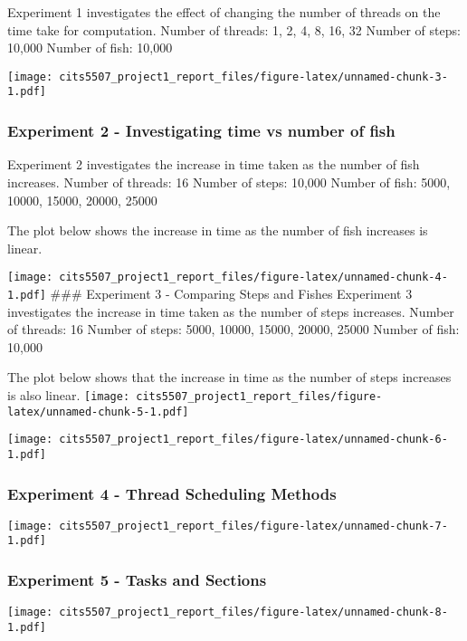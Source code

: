\documentclass[
]{article}
\begin{document}
Experiment 1 investigates the effect of changing the number of threads
on the time take for computation. Number of threads: 1, 2, 4, 8, 16, 32
Number of steps: 10,000 Number of fish: 10,000

\texttt{[image: cits5507\_project1\_report\_files/figure-latex/unnamed-chunk-3-1.pdf]}

\hypertarget{experiment-2---investigating-time-vs-number-of-fish}{%
\subsubsection{Experiment 2 - Investigating time vs number of
fish}\label{experiment-2---investigating-time-vs-number-of-fish}}

Experiment 2 investigates the increase in time taken as the number of
fish increases. Number of threads: 16 Number of steps: 10,000 Number of
fish: 5000, 10000, 15000, 20000, 25000

The plot below shows the increase in time as the number of fish
increases is linear.

\texttt{[image: cits5507\_project1\_report\_files/figure-latex/unnamed-chunk-4-1.pdf]}
\#\#\# Experiment 3 - Comparing Steps and Fishes Experiment 3
investigates the increase in time taken as the number of steps
increases. Number of threads: 16 Number of steps: 5000, 10000, 15000,
20000, 25000 Number of fish: 10,000

The plot below shows that the increase in time as the number of steps
increases is also linear.
\texttt{[image: cits5507\_project1\_report\_files/figure-latex/unnamed-chunk-5-1.pdf]}

\texttt{[image: cits5507\_project1\_report\_files/figure-latex/unnamed-chunk-6-1.pdf]}

\hypertarget{experiment-4---thread-scheduling-methods}{%
\subsubsection{Experiment 4 - Thread Scheduling
Methods}\label{experiment-4---thread-scheduling-methods}}

\texttt{[image: cits5507\_project1\_report\_files/figure-latex/unnamed-chunk-7-1.pdf]}

\hypertarget{experiment-5---tasks-and-sections}{%
\subsubsection{Experiment 5 - Tasks and
Sections}\label{experiment-5---tasks-and-sections}}

\texttt{[image: cits5507\_project1\_report\_files/figure-latex/unnamed-chunk-8-1.pdf]}
\end{document}
